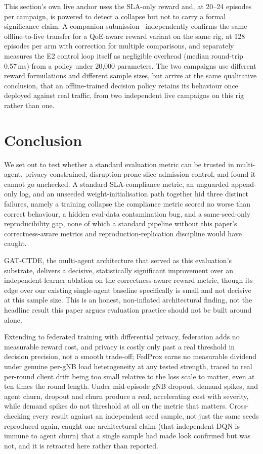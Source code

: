 \documentclass[pdflatex,sn-basic,Numbered]{sn-jnl}%
\begin{document}
This section's own live anchor uses the SLA-only reward and, at 20--24 episodes per campaign, is powered to detect a collapse but not to carry a formal significance claim. A companion submission~\cite{cacs26-paper} independently confirms the same offline-to-live transfer for a QoE-aware reward variant on the same rig, at 128 episodes per arm with correction for multiple comparisons, and separately measures the E2 control loop itself as negligible overhead (median round-trip 0.57\,ms) from a policy under 20,000 parameters. The two campaigns use different reward formulations and different sample sizes, but arrive at the same qualitative conclusion, that an offline-trained decision policy retains its behaviour once deployed against real traffic, from two independent live campaigns on this rig rather than one.

\section{Conclusion}
\label{sec:conclusion}
We set out to test whether a standard evaluation metric can be
trusted in multi-agent, privacy-constrained, disruption-prone slice
admission control, and found it cannot go unchecked. A standard SLA-compliance metric, an unguarded append-only log, and an unseeded weight-initialisation path together hid three distinct failures, namely a training collapse the compliance metric scored no worse than correct behaviour, a hidden eval-data contamination bug, and a same-seed-only reproducibility gap, none of which a standard pipeline without this paper's correctness-aware metrics and reproduction-replication discipline would have caught.

GAT-CTDE, the multi-agent architecture that served as this evaluation's substrate, delivers a decisive, statistically significant improvement over an independent-learner ablation on the correctness-aware reward metric, though its edge over our existing single-agent baseline specifically is small and not decisive at this sample size. This is an honest, non-inflated architectural finding, not the headline result this paper argues evaluation practice should not be built around alone.

Extending to federated training with differential privacy, federation
adds no measurable reward cost, and privacy is costly only past a real
threshold in decision precision, not a smooth trade-off; FedProx earns
no measurable dividend under genuine per-gNB load heterogeneity at any
tested strength, traced to real per-round client drift being too small
relative to the loss scale to matter, even at ten times the round
length. Under mid-episode gNB dropout, demand spikes, and agent churn, dropout and churn produce a real, accelerating cost with severity, while demand spikes do not threshold at all on the metric that matters. Cross-checking every result against an independent seed sample, not just the same seeds reproduced again, caught one architectural claim (that independent DQN is immune to agent churn) that a single sample had made look confirmed but was not, and it is retracted here rather than reported.
\end{document}
